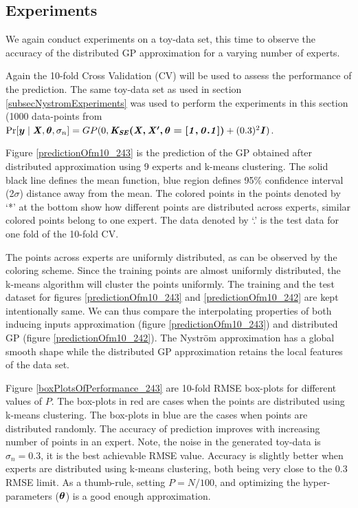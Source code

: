 \subsection{Experiments}\label{subSecDistributedExperiments}
We again conduct experiments on a toy-data set, this time to observe the accuracy of the distributed GP approximation for a varying number of experts. 

Again the 10-fold Cross Validation (CV) will be used to assess the performance of the prediction. The same toy-data set as used in section \ref{subsecNystromExperiments} was used to perform the experiments in this section (1000 data-points from $\Pr[\boldsymbol{y} \mid \bm{\mathit{X}}, \boldsymbol{\theta}, \sigma_{n}] = GP(0, \bm{\mathit{K_{SE}(X, X', \theta = [1, 0.1])}} + (0.3)^{2}\bm{\mathit{I}})$.

Figure \ref{predictionOfm10_243} is the prediction of the GP obtained after distributed approximation using 9 experts and k-means clustering. The solid black line defines the mean function, blue region defines 95\% confidence interval (2$\sigma$) distance away from the mean. The colored points in the points denoted by `*' at the bottom show how different points are distributed across experts, similar colored points belong to one expert. The data denoted by `.' is the test data for one fold of the 10-fold CV. 

The points across experts are uniformly distributed, as can be observed by the coloring scheme. Since the training points are almost uniformly distributed, the k-means algorithm will cluster the points uniformly. The training and the test dataset for figures \ref{predictionOfm10_243} and \ref{predictionOfm10_242} are kept intentionally same. We can thus compare the interpolating properties of both inducing inputs approximation (figure \ref{predictionOfm10_243}) and distributed GP (figure \ref{predictionOfm10_242}). The Nystr\"{o}m approximation has a global smooth shape while the distributed GP approximation retains the local features of the data set. 

Figure \ref{boxPlotsOfPerformance_243} are 10-fold RMSE box-plots for different values of $P$. The box-plots in red are cases when the points are distributed using k-means clustering. The box-plots in blue are the cases when points are distributed randomly. The accuracy of prediction improves with increasing number of points in an expert. Note, the noise in the generated toy-data is $\sigma_{n}=0.3$, it is the best achievable RMSE value. Accuracy is slightly better when experts are distributed using k-means clustering, both being very close to the $0.3$ RMSE limit. As a thumb-rule, setting $P = N/100$, and optimizing the hyper-parameters ($\boldsymbol{\theta}$) is a good enough approximation. 



